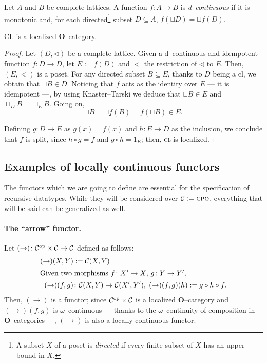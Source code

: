 \begin{dfn}
  Let \(A\) and \(B\) be complete lattices.
  A function \(f \colon A \to B\) is \emph{d--continuous} %
 if it is monotonic and, for each directed\footnote{A subset \(X\) of a poset is \emph{directed} if every finite subset of \(X\) has an upper bound in \(X\).} subset \(D \subseteq A\),
 \(f(\sqcup D) = \sqcup f(D)\).
\end{dfn}

\begin{prp}
  \textsc{CL} is a localized \(\mathbf{O}\)--category.
\end{prp}
\begin{proof}
  Let \((D, \lhd)\) be a complete lattice.
  Given a d--continuous and idempotent function \(f \colon D \to D\), let \(E := f(D)\) and \(<\) the restriction of \(\lhd\) to \(E\). %
  Then, \((E,<)\) is a poset. For any directed subset \(B \subseteq E\), thanks to \(D\) being a cl, we obtain that \(\sqcup B \in D\).
  Noticing that \(f\) acts as the identity over \(E\) --- it is idempotent ---, by using Knaster--Tarski we deduce that \(\sqcup B \in E\) and \(\sqcup_D B = \sqcup_E B\). %
  Going on,
  \begin{equation*}
    \sqcup B = \sqcup f(B) = f(\sqcup B) \in E.
  \end{equation*}

  Defining \(g \colon D \to E\) as \(g(x) = f(x)\) and \(h \colon E \to D\) as the inclusion, we conclude that \(f\) is split, since \(h \circ g = f\) and \(g \circ h = 1_E\); then, \textsc{cl} is localized.
\end{proof}

\subsection{Examples of locally continuous functors}

The functors which we are going to define are essential for the specification of recursive datatypes. While they will be considered over \(\mathcal{C} := \mathrm{\textsc{cpo}}\), everything that will be said can be generalized as well.

\paragraph{The ``arrow'' functor.}
Let \((\rightarrow) \colon \mathcal{C}^\textup{op} \times \mathcal{C} \to \mathcal{C}\) defined as follows:
\begin{align*}
    (\rightarrow)(X,Y) &:= \mathcal{C}(X,Y) \\
    \intertext{Given two morphisms \(f \colon X' \to X\), \(g \colon Y \to Y'\),}
    (\rightarrow)(f,g) &\colon
      \mathcal{C}(X,Y) \to \mathcal{C}(X',Y'), \;
      (\rightarrow)(f,g)(h) := g \circ h \circ f.
\end{align*}
Then, \((\rightarrow)\) is a functor; since \(\mathcal{C}^\textup{op} \times \mathcal{C}\) is a localized \(\mathbf{O}\)--category and \((\rightarrow)(f,g)\) is \(\omega\)--continuous --- thanks to the \(\omega\)--continuity of composition in \(\mathbf{O}\)--categories ---, \((\rightarrow)\) is also a locally continuous functor. %


